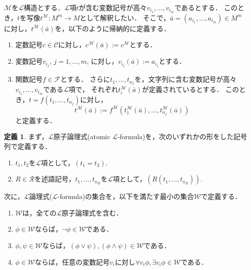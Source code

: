 \documentclass[uplatex, dvipdfmx]{jsarticle}
\numberwithin{equation}{section}
\newcommand{\map}[3]{{#1}\colon{#2}\rightarrow{#3}}
\theoremstyle{definition}
\newtheorem{definition}{定義}[section]
\begin{document}
$\mathcal{M}$を$\mathcal{L}$構造とする．$\mathcal{L}$項$t$が含む変数記号が高々$v_{i_1}, \dots, v_{i_m}$であるとする．
このとき，$t$を写像$\map{t^\mathcal{M}}{M^m}{M}$として解釈したい．
そこで，$\bar{a} = (a_{i_1}, \dots, a_{i_m}) \in M^m$に対し，$t^\mathcal{M}(\bar{a})$を，以下のように帰納的に定義する．

\begin{enumerate}
     \item 定数記号$c \in \mathcal{C}$に対し，$c^\mathcal{M}(\bar{a}) := c^\mathcal{M}$とする．
     \item 変数記号$v_{i_j}$, $j=1, \dots, m$, に対し，$v_{i_j}(\bar{a}) := a_{i_j}$とする．
     \item 
     関数記号$f \in \mathcal{F}$とする．
     さらに$t_1, \dots, t_{n_f}$を，文字列に含む変数記号が高々$v_{i_1}, \dots, v_{i_m}$である$\mathcal{L}$項で，
     それぞれ$t_i^\mathcal{M}(\bar{a})$が定義されているとする．
     このとき，$t = f(t_1, \dots, t_{n_f})$に対し，
     \begin{equation}
          t^\mathcal{M}(\bar{a}):= f^\mathcal{M}(t_1^\mathcal{M}(\bar{a}), \dots, t_{n_f}^\mathcal{M}(\bar{a}))
     \end{equation}
     と定義する．
\end{enumerate}

\begin{definition}
     まず，$\mathcal{L}$原子論理式(atomic $\mathcal{L}$-formula)を，次のいずれかの形をした記号列で定義する．
     \begin{enumerate}
          \item $t_1, t_2$を$\mathcal{L}$項として，$(t_1 = t_2)$.
          \item $R \in \mathcal{R}$を述語記号，$t_1, \dots, t_{n_R}$を$\mathcal{L}$項として，$(R(t_1, \dots, t_{n_R}))$.
     \end{enumerate}

     次に，$\mathcal{L}$論理式($\mathcal{L}$-formula)の集合を，以下を満たす最小の集合$\mathcal{W}$で定義する．
     \begin{enumerate}
          \item $\mathcal{W}$は，全ての$\mathcal{L}原子論理式$を含む．
          \item $\phi \in \mathcal{W}$ならば，$\lnot \phi \in \mathcal{W}$である．
          \item $\phi, \psi \in \mathcal{W}$ならば，$(\phi \lor \psi), (\phi \land \psi) \in \mathcal{W}$である．
          \item $\phi \in \mathcal{W}$ならば，任意の変数記号$v_i$に対し$\forall v_i \phi, \exists v_i \phi \in \mathcal{W}$である．
     \end{enumerate}
\end{definition}
\end{document}
